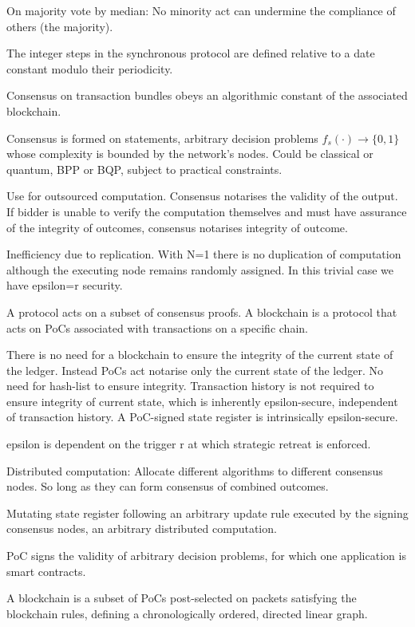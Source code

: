 On majority vote by median: No minority act can undermine the compliance of others (the majority).

The integer steps in the synchronous protocol are defined relative to a date constant modulo their periodicity.

Consensus on transaction bundles obeys an algorithmic constant of the associated blockchain.

Consensus is formed on statements, arbitrary decision problems  $f_s(\cdot)\to \{0,1\}$ whose complexity is bounded by the network's nodes. Could be classical or quantum, BPP or BQP, subject to practical constraints.

Use for outsourced computation. Consensus notarises the validity of the output. If bidder is unable to verify the computation themselves and must have assurance of the integrity of outcomes, consensus notarises integrity of outcome.

Inefficiency due to replication. With N=1 there is no duplication of computation although the executing node remains randomly assigned. In this trivial case we have epsilon=r security.

A protocol acts on a subset of consensus proofs. A blockchain is a protocol that acts on PoCs associated with transactions on a specific chain.

There is no need for a blockchain to ensure the integrity of the current state of the ledger. Instead PoCs act notarise only the current state of the ledger. No need for hash-list to ensure integrity. Transaction history is not required to ensure integrity of current state, which is inherently epsilon-secure, independent of transaction history. A PoC-signed state register is intrinsically epsilon-secure.

epsilon is dependent on the trigger r at which strategic retreat is enforced.

Distributed computation: Allocate different algorithms to different consensus nodes. So long as they can form consensus of combined outcomes.

Mutating state register following an arbitrary update rule executed by the signing consensus nodes, an arbitrary distributed computation.

PoC signs the validity of arbitrary decision problems, for which one application is smart contracts.

A blockchain is a subset of PoCs post-selected on packets satisfying the blockchain rules, defining a chronologically ordered, directed linear graph.

